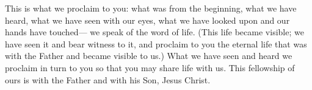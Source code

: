 \lettrine[lines=3]{T}{}his is what we proclaim to you:
what was from the beginning,
what we have heard,
what we have seen with our eyes,
what we have looked upon
and our hands have touched—
we speak of the word of life.
(This life became visible;
we have seen it and bear witness to it,
and proclaim to you the eternal life
that was with the Father
and became visible to us.)
What we have seen and heard
we proclaim in turn to you
so that you may share life with us.
This fellowship of ours is with the Father
and with his Son, Jesus Christ.
